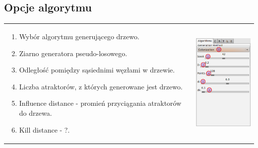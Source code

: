 \subsection{Opcje algorytmu}
\begin{tabular}{lr}
\parbox[b]{95mm}{
\begin{enumerate}
	\item {Wybór algorytmu generującego drzewo.}
	\item {Ziarno generatora pseudo-losowego.}
	\item {Odległość pomiędzy sąsiednimi węzłami w drzewie.}
	\item {Liczba atraktorów, z których generowane jest drzewo.}
	\item {Influence distance - promień przyciągania atraktorów do drzewa.}
	\item {Kill distance - ?.}
\end{enumerate}
} &
\includegraphics[width=35mm]{images/gui/algorithms_panel.png} \\
\end{tabular}



